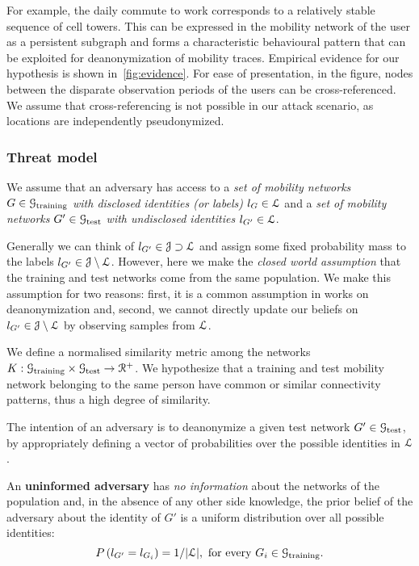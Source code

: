 For example, the daily commute to work corresponds to a relatively stable sequence of cell towers.
This can be expressed in the mobility network of the user as a persistent subgraph and forms a characteristic behavioural pattern that can be exploited for deanonymization of mobility traces.
Empirical evidence for our hypothesis is shown in~\cref{fig:evidence}.
For ease of presentation, in the figure, nodes between the disparate observation periods of the users can be cross-referenced. We assume that cross-referencing is not possible in our attack scenario, as locations are independently pseudonymized.

\subsubsection{Threat model \label{sec:threat-model}}

We assume that an adversary has access to a \emph{set of mobility networks} $ G \in \mathcal{G}_{\text{training}} $ \emph{with disclosed identities (or labels)} $l_{G} \in \mathcal{L}$
and a \emph{set of mobility networks} $ G' \in \mathcal{G}_{\text{test}} $ \emph{with undisclosed identities}
$ l_{G'} \in \mathcal{L}$.%

{Generally we can think of $ l_{G'} \in \mathcal{J} \supset \mathcal{L}$ and assign some fixed probability mass to the labels $ l_{G'} \in \mathcal{J} \setminus \mathcal{L}$.
However, here we make the \emph{closed world assumption} that the training and test networks come from the same population.
We make this assumption for two reasons: first, it is a common assumption in works on deanonymization and, second, we cannot directly update our beliefs on $ l_{G'} \in \mathcal{J} \setminus \mathcal{L}$ by observing samples from $ \mathcal{L}$. }

We define a normalised similarity metric among the networks $ K: \mathcal{G}_{\text{training}} \times \mathcal{G}_{\text{test}} \rightarrow \mathcal{R}^+ $.
We hypothesize that a training and test mobility network belonging to the same person have common or similar connectivity patterns, thus a high degree of similarity.

The intention of an adversary is to deanonymize a given test network $ G' \in \mathcal{G}_{\text{test}} $, by appropriately defining a vector of probabilities over the possible identities in $ \mathcal{L}$.

An \textbf{uninformed adversary} has \emph{no information} about the networks of the population and, in the absence of any other side knowledge, the prior belief of the adversary about the identity of $ G' $ is a uniform distribution over all possible identities:
\[
	P\left(l_{G'}= l_{G_i}\right) = 1/|\mathcal{L}|, \mbox{ for every }  G_i \in \mathcal{G}_{\text{training}}.
\]

